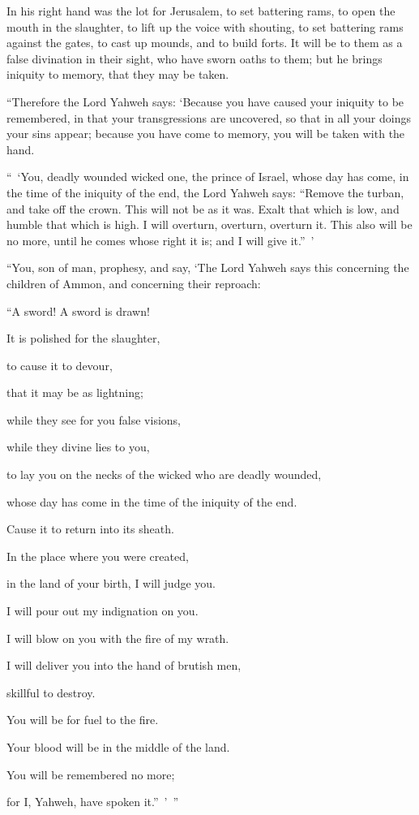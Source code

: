 {In his right hand was the lot for Jerusalem, to set battering rams, to open the mouth in the slaughter, to lift up the voice with shouting, to set battering rams against the gates, to cast up mounds, and to build forts.
It will be to them as a false divination in their sight, who have sworn oaths to them; but he brings iniquity to memory, that they may be taken.
\par }{\PP {}“Therefore the Lord Yahweh says: ‘Because you have caused your iniquity to be remembered, in that your transgressions are uncovered, so that in all your doings your sins appear; because you have come to memory, you will be taken with the hand.
\par }{\PP {}“ ‘You, deadly wounded wicked one, the prince of Israel, whose day has come, in the time of the iniquity of the end,
the Lord Yahweh says: “Remove the turban, and take off the crown. This will not be as it was. Exalt that which is low, and humble that which is high.
I will overturn, overturn, overturn it. This also will be no more, until he comes whose right it is; and I will give it.” ’
\par }{\PP {}“You, son of man, prophesy, and say, ‘The Lord Yahweh says this concerning the children of Ammon, and concerning their reproach:
\par }{\Q “A sword! A sword is drawn!
\par }{\QB It is polished for the slaughter,
\par }{\Q to cause it to devour,
\par }{\QB that it may be as lightning;
\par }{\Q {}while they see for you false visions,
\par }{\QB while they divine lies to you,
\par }{\Q to lay you on the necks of the wicked who are deadly wounded,
\par }{\QB whose day has come in the time of the iniquity of the end.
\par }{\Q {}Cause it to return into its sheath.
\par }{\QB In the place where you were created,
\par }{\QB in the land of your birth, I will judge you.
\par }{\Q {}I will pour out my indignation on you.
\par }{\QB I will blow on you with the fire of my wrath.
\par }{\Q I will deliver you into the hand of brutish men,
\par }{\QB skillful to destroy.
\par }{\Q {}You will be for fuel to the fire.
\par }{\QB Your blood will be in the middle of the land.
\par }{\Q You will be remembered no more;
\par }{\QB for I, Yahweh, have spoken it.” ’ ”

}
